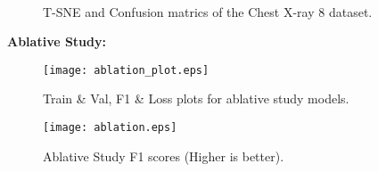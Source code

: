 \documentclass[10pt,twocolumn,letterpaper]{article}
\begin{document}
\begin{figure}
  \\
  \caption{T-SNE and Confusion matrics of the Chest X-ray 8 dataset.}
  \label{fig:tsne_xray8}
\end{figure}

\textbf{Ablative Study:}



\begin{figure}[t]
  \centering
  \texttt{[image: ablation\_plot.eps]}  
   \caption{Train \& Val, F1 \& Loss plots for ablative study models.}
   \label{fig:ablation_plot}
\end{figure}
\begin{figure}[t]
  \centering
  \texttt{[image: ablation.eps]}  
   \caption{Ablative Study F1 scores (Higher is better).}
   \label{fig:ablation}
\end{figure}



\clearpage
{\small


}
\end{document}
